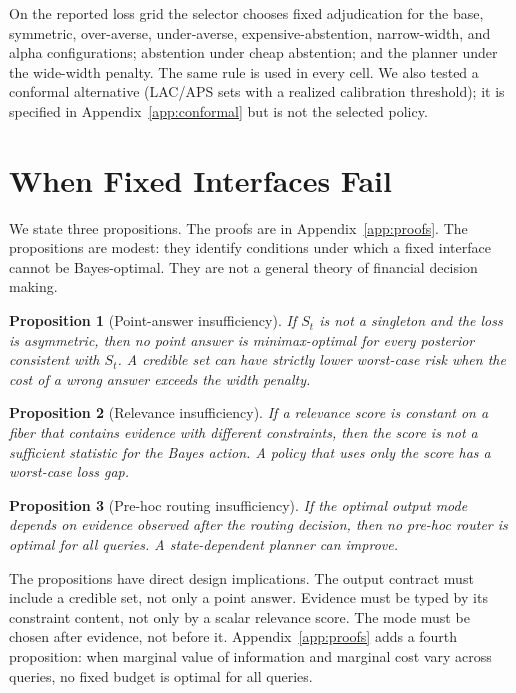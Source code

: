 \documentclass[11pt]{article}
\newtheorem{proposition}{Proposition}
\begin{document}
On the reported loss grid the selector chooses fixed adjudication for the
base, symmetric, over-averse, under-averse, expensive-abstention,
narrow-width, and alpha configurations; abstention under cheap abstention;
and the planner under the wide-width penalty. The same rule is used in every
cell. We also tested a conformal alternative (LAC/APS sets with a realized
calibration threshold); it is specified in Appendix~\ref{app:conformal} but is
not the selected policy.

\section{When Fixed Interfaces Fail}

We state three propositions. The proofs are in Appendix~\ref{app:proofs}. The propositions are modest: they identify conditions under which a fixed interface cannot be Bayes-optimal. They are not a general theory of financial decision making.

\begin{proposition}[Point-answer insufficiency]
If $S_t$ is not a singleton and the loss is asymmetric, then no point answer is minimax-optimal for every posterior consistent with $S_t$. A credible set can have strictly lower worst-case risk when the cost of a wrong answer exceeds the width penalty.
\end{proposition}

\begin{proposition}[Relevance insufficiency]
If a relevance score is constant on a fiber that contains evidence with different constraints, then the score is not a sufficient statistic for the Bayes action. A policy that uses only the score has a worst-case loss gap.
\end{proposition}

\begin{proposition}[Pre-hoc routing insufficiency]
If the optimal output mode depends on evidence observed after the routing decision, then no pre-hoc router is optimal for all queries. A state-dependent planner can improve.
\end{proposition}

The propositions have direct design implications. The output contract must include a credible set, not only a point answer. Evidence must be typed by its constraint content, not only by a scalar relevance score. The mode must be chosen after evidence, not before it. Appendix~\ref{app:proofs} adds a fourth proposition: when marginal value of information and marginal cost vary across queries, no fixed budget is optimal for all queries.
\end{document}
